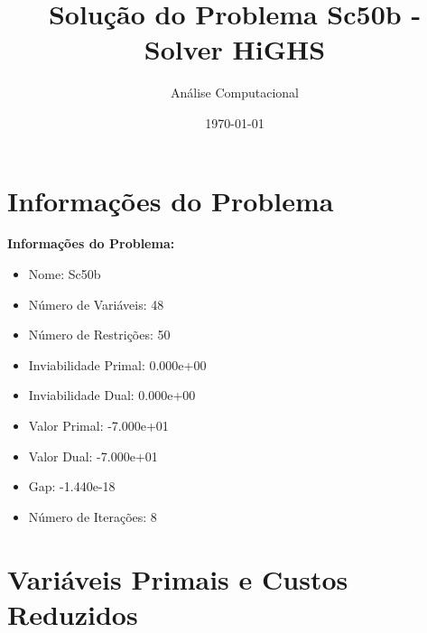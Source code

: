 \documentclass[12pt]{article}
\title{Solução do Problema Sc50b - Solver HiGHS}
\author{Análise Computacional}
\date{\today}
\begin{document}
\maketitle

\section{Informações do Problema}

\textbf{Informações do Problema:}
\begin{itemize}
\item Nome: Sc50b
\item Número de Variáveis: 48
\item Número de Restrições: 50
\item Inviabilidade Primal: 0.000e+00
\item Inviabilidade Dual: 0.000e+00
\item Valor Primal: -7.000e+01
\item Valor Dual: -7.000e+01
\item Gap: -1.440e-18
\item Número de Iterações: 8
\end{itemize}


\section{Variáveis Primais e Custos Reduzidos}
\end{document}
